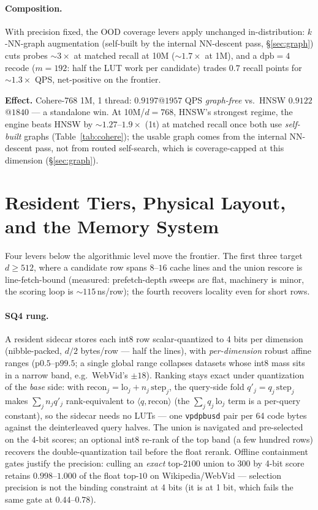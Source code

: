\documentclass{article}
\newcommand{\effect}[1]{\par\smallskip\noindent\textbf{Effect.} #1}
\begin{document}
\paragraph{Composition.} With precision fixed, the OOD coverage levers apply
unchanged in-distribution: $k$-NN-graph augmentation (self-built by the internal NN-descent pass,
\S\ref{sec:graph}) cuts probes ${\sim}3\times$ at matched recall at 10M
(${\sim}1.7\times$ at 1M), and a
$\text{dpb}{=}4$ recode ($m{=}192$: half the LUT work per candidate) trades
$0.7$ recall points for ${\sim}1.3\times$ QPS, net-positive on the frontier.
\effect{Cohere-768 1M, 1 thread: $0.9197$@$1957$ QPS \emph{graph-free} vs.\ HNSW
$0.9122$@$1840$ --- a standalone win. At 10M/$d{=}768$, HNSW's strongest regime, the engine
beats HNSW by ${\sim}1.27$--$1.9\times$ (1t) at matched recall once both use \emph{self-built}
graphs (Table~\ref{tab:cohere}); the usable graph comes from the internal NN-descent pass,
not from routed self-search, which is coverage-capped at this dimension (\S\ref{sec:graph}).}

\section{Resident Tiers, Physical Layout, and the Memory System}
\label{sec:resident}
Four levers below the algorithmic level move the frontier. The first three target
$d{\ge}512$, where a candidate row spans $8$--$16$ cache lines and the union
rescore is line-fetch-bound (measured: prefetch-depth sweeps are flat, machinery is
minor, the scoring loop is ${\sim}115$\,ns/row); the fourth recovers locality even
for short rows.

\paragraph{SQ4 rung.} A resident sidecar stores each int8 row scalar-quantized to
4 bits per dimension (nibble-packed, $d/2$ bytes/row --- half the lines), with
\emph{per-dimension} robust affine ranges (p$0.5$--p$99.5$; a single global range
collapses datasets whose int8 mass sits in a narrow band, e.g.\ WebVid's $\pm18$).
Ranking stays exact under quantization of the \emph{base} side: with
$\text{recon}_j = \text{lo}_j + n_j\,\text{step}_j$, the query-side fold
$q'_j = q_j\,\text{step}_j$ makes $\sum_j n_j q'_j$ rank-equivalent to
$\langle q,\text{recon}\rangle$ (the $\sum_j q_j\,\text{lo}_j$ term is a per-query
constant), so the sidecar needs no LUTs --- one \texttt{vpdpbusd} pair per 64 code
bytes against the deinterleaved query halves. The union is navigated and pre-selected
on the 4-bit scores; an optional int8 re-rank of the top band (a few hundred rows)
recovers the double-quantization tail before the float rerank. Offline containment
gates justify the precision: culling an \emph{exact} top-$2100$ union to $300$ by
4-bit score retains $0.998$--$1.000$ of the float top-$10$ on Wikipedia/WebVid ---
selection precision is not the binding constraint at 4 bits (it is at 1 bit, which
fails the same gate at $0.44$--$0.78$).
\end{document}
